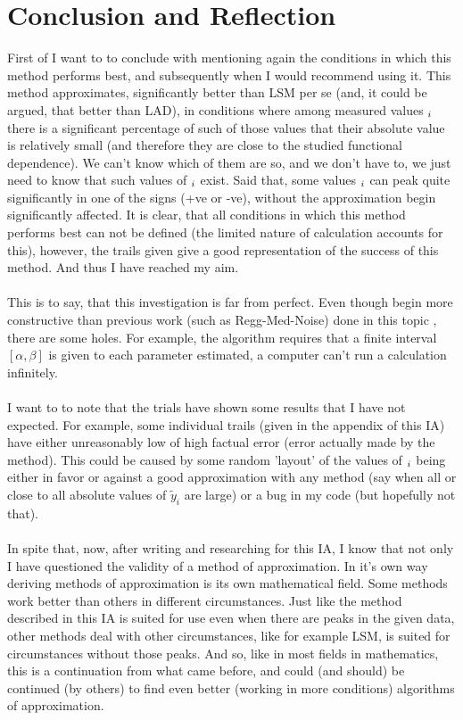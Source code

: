 \section{Conclusion and Reflection}
First of I want to to conclude with mentioning again the conditions in which this method performs best, and subsequently when I would recommend using it. This method approximates, significantly better than LSM per se (and, it could be argued, that better than LAD), in conditions where among measured values $\title{y}_{i}$ there is a significant percentage of such of those values that their absolute value is relatively small (and therefore they are close to the studied functional dependence). We can't know which of them are so, and we don't have to, we just need to know that such values of $\title{y}_{i}$ exist. Said that, some values $\title{y}_{i}$ can peak quite significantly in one of the signs (+ve or -ve), without the approximation begin significantly affected. It is clear, that all conditions in which this method performs best can not be defined (the limited nature of calculation accounts for this), however, the trails given give a good representation of the success of this method.  And thus I have reached my aim. \\
\\
This is to say, that this investigation is far from perfect. Even though begin more constructive than previous work (such as Regg-Med-Noise) done in this topic , there are some holes. For example, the algorithm requires that a finite interval $[\alpha, \beta]$ is given to each parameter estimated, a computer can't run a calculation infinitely. \\
\\
I want to to note that the trials have shown  some results that I have not expected. For example, some individual trails (given in the appendix of this IA) have either unreasonably low of high factual error (error actually made by the method). This could be caused by some random 'layout' of the values of $\title{y}_{i}$ being either in favor or against a good approximation with any method (say when all or close to all absolute values of $\tilde{y}_{i}$ are large) or a bug in my code (but hopefully not that). \\
\\
In spite that, now, after writing and researching for this IA, I know that not only I have questioned the validity of a method of approximation. In it's own way deriving methods of approximation is its own mathematical field. Some methods work better than others in different circumstances. Just like the method described in this IA is suited for use even when there are peaks in the given data, other methods deal with other circumstances, like for example LSM, is suited for circumstances without those peaks. And so, like in most fields in mathematics, this is a continuation from what came before, and could (and should) be continued (by others) to find even better (working in more conditions) algorithms of approximation.



\newpage





